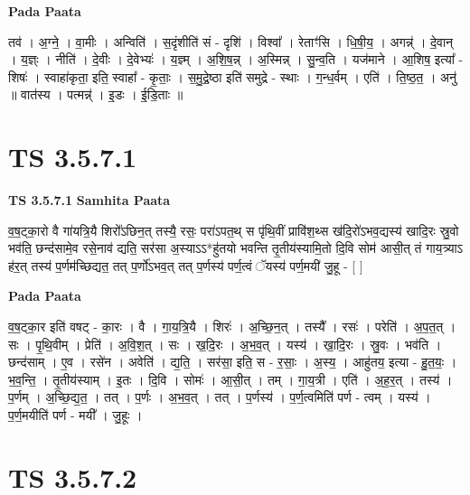 \documentclass[17pt]{extarticle}
\begin{document}
\textbf{Pada Paata} \newline

तव॑ । अ॒ग्ने॒ । वा॒मीः । अन्विति॑ । स॒दृंशीति॑ सं - दृशि॑ । विश्वा᳚ । रेताꣳ॑सि । धि॒षी॒य॒ । अगन्न्॑ । दे॒वान् । य॒ज्ञ्ः । नीति॑ । दे॒वीः । दे॒वेभ्यः॑ । य॒ज्ञ्म् । अ॒शि॒ष॒न्न् । अ॒स्मिन्न् । सु॒न्व॒ति । यज॑माने । आ॒शिष॒ इत्या᳚ - शिषः॑ । स्वाहा॑कृता॒ इति॒ स्वाहा᳚ - कृ॒ताः॒ । स॒मु॒द्रे॒ष्ठा इति॑ समुद्रे - स्थाः । ग॒न्ध॒र्वम् । एति॑ । ति॒ष्ठ॒त॒ । अनु॑ ॥ वात॑स्य । पत्मन्न्॑ । इ॒डः । ई॒डि॒ताः ॥  \newline




\section*{ TS 3.5.7.1 }

\textbf{TS 3.5.7.1 } \newline
\textbf{Samhita Paata} \newline

व॒ष॒ट्का॒रो वै गा॑यत्रि॒यै शिरो᳚ऽछिन॒त् तस्यै॒ रसः॒ परा॑ऽपत॒थ् स पृ॑थि॒वीं प्रावि॑श॒थ्स ख॑दि॒रो॑ऽभव॒द्यस्य॑ खादि॒रः स्रु॒वो भव॑ति॒ छन्द॑सामे॒व रसे॒नाव॑ द्यति॒ सर॑सा अ॒स्याऽऽ*हु॑तयो भवन्ति तृ॒तीय॑स्यामि॒तो दि॒वि सोम॑ आसी॒त् तं गाय॒त्र्याऽ ह॑र॒त् तस्य॑ प॒र्णम॑च्छिद्यत॒ तत् प॒र्णो॑ऽभव॒त् तत् प॒र्णस्य॑ पर्ण॒त्वं ॅयस्य॑ पर्ण॒मयी॑ जु॒हू - [  ] \newline

\textbf{Pada Paata} \newline

व॒ष॒ट्का॒र इति॑ वषट् - का॒रः । वै । गा॒य॒त्रि॒यै । शिरः॑ । अ॒च्छि॒न॒त् । तस्यै᳚ । रसः॑ । परेति॑ । अ॒प॒त॒त् । सः । पृ॒थि॒वीम् । प्रेति॑ । अ॒वि॒श॒त् । सः । ख॒दि॒रः । अ॒भ॒व॒त् । यस्य॑ । खा॒दि॒रः । स्रु॒वः । भव॑ति । छन्द॑साम् । ए॒व । रसे॑न । अवेति॑ । द्य॒ति॒ । सर॑सा॒ इति॒ स - र॒साः॒ । अ॒स्य॒ । आहु॑तय॒ इत्या - हु॒त॒यः॒ । भ॒व॒न्ति॒ । तृ॒तीय॑स्याम् । इ॒तः । दि॒वि । सोमः॑ । आ॒सी॒त् । तम् । गा॒य॒त्री । एति॑ । अ॒ह॒र॒त् । तस्य॑ । प॒र्णम् । अ॒च्छि॒द्य॒त॒ । तत् । प॒र्णः । अ॒भ॒व॒त् । तत् । प॒र्णस्य॑ । प॒र्ण॒त्वमिति॑ पर्ण - त्वम् । यस्य॑ । प॒र्ण॒मयीति॑ पर्ण - मयी᳚ । जु॒हूः ।  \newline




\section*{ TS 3.5.7.2 }
\end{document}
